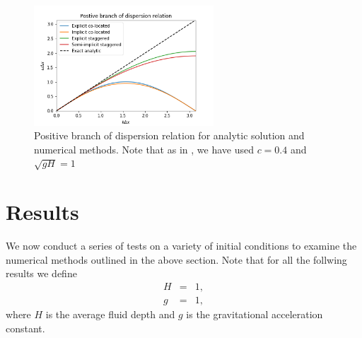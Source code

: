 \documentclass[a4paper, 10pt, notitlepage]{article}
\begin{document}
\begin{figure}[H]
	\begin{center}

	\centering
	\includegraphics[width=0.6\textwidth]{dispersion_relations.png}
	\caption{Positive branch of dispersion relation for analytic solution and numerical methods. Note that as in \cite{MPE textbook}, we have used $c=0.4$ and $\sqrt{gH} = 1$} \label{dispersionfigure}

	\end{center}
\end{figure}

\section{Results}\label{resultssection}
We now conduct a series of tests on a variety of initial conditions to examine the numerical methods outlined in the above section. Note that for all the follwing results we define
\begin{eqnarray}
H & = & 1,\\
g & = & 1,
\end{eqnarray}
where $H$ is the average fluid depth and $g$ is the gravitational acceleration constant.
\end{document}
